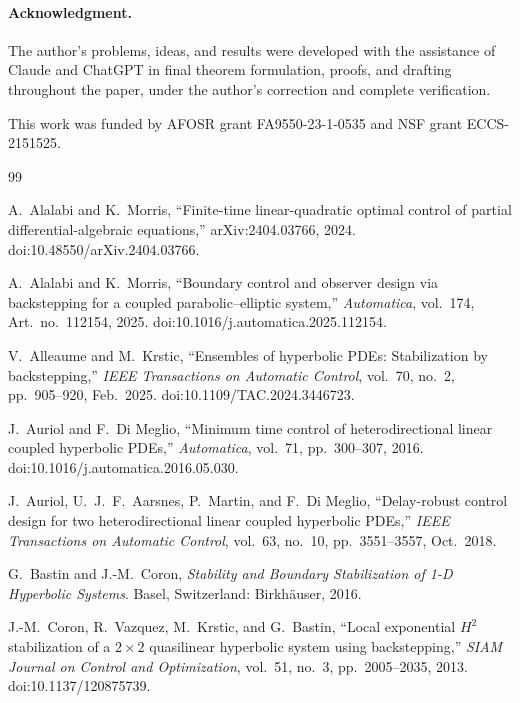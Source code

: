 \documentclass[12pt]{article}
\theoremstyle{plain}
\theoremstyle{remark}
\begin{document}
\medskip\paragraph{Acknowledgment.}
The author's problems, ideas, and results were developed with the assistance of Claude and ChatGPT in final theorem formulation, proofs, and drafting throughout the paper, under the author's correction and complete verification.

This work was funded by AFOSR grant FA9550-23-1-0535 and NSF grant ECCS-2151525.
\medskip

\begin{thebibliography}{99}

A.~Alalabi and K.~Morris,
``Finite-time linear-quadratic optimal control of partial differential-algebraic equations,''
arXiv:2404.03766, 2024.
doi:10.48550/arXiv.2404.03766.

A.~Alalabi and K.~Morris,
``Boundary control and observer design via backstepping for a coupled parabolic--elliptic system,''
\emph{Automatica}, vol.~174, Art.~no.~112154, 2025.
doi:10.1016/j.automatica.2025.112154.

V.~Alleaume and M.~Krstic,
``Ensembles of hyperbolic PDEs: Stabilization by backstepping,''
\emph{IEEE Transactions on Automatic Control}, vol.~70, no.~2, pp.~905--920, Feb.~2025.
doi:10.1109/TAC.2024.3446723.

J.~Auriol and F.~Di Meglio,
``Minimum time control of heterodirectional linear coupled hyperbolic PDEs,''
\emph{Automatica}, vol.~71, pp.~300--307, 2016.
doi:10.1016/j.automatica.2016.05.030.

J.~Auriol, U.~J.~F.~Aarsnes, P.~Martin, and F.~Di Meglio,
``Delay-robust control design for two heterodirectional linear coupled hyperbolic PDEs,''
\emph{IEEE Transactions on Automatic Control}, vol.~63, no.~10, pp.~3551--3557, Oct.~2018.

G.~Bastin and J.-M.~Coron,
\emph{Stability and Boundary Stabilization of 1-D Hyperbolic Systems}.
Basel, Switzerland: Birkh\"auser, 2016.

J.-M.~Coron, R.~Vazquez, M.~Krstic, and G.~Bastin,
``Local exponential $H^2$ stabilization of a $2\times2$ quasilinear hyperbolic system using backstepping,''
\emph{SIAM Journal on Control and Optimization}, vol.~51, no.~3, pp.~2005--2035, 2013.
doi:10.1137/120875739.


\end{thebibliography}
\end{document}

